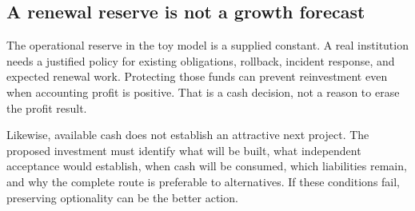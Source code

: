 \subsection{A renewal reserve is not a growth forecast}
The operational reserve in the toy model is a supplied constant. A real institution needs a justified policy for existing obligations, rollback, incident response, and expected renewal work. Protecting those funds can prevent reinvestment even when accounting profit is positive. That is a cash decision, not a reason to erase the profit result.

Likewise, available cash does not establish an attractive next project. The proposed investment must identify what will be built, what independent acceptance would establish, when cash will be consumed, which liabilities remain, and why the complete route is preferable to alternatives. If these conditions fail, preserving optionality can be the better action.
